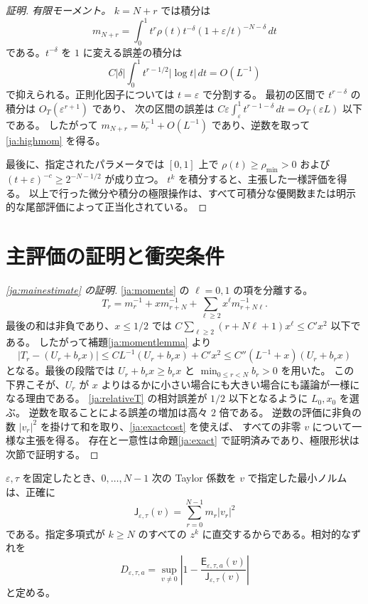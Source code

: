 \documentclass[12pt]{amsart}
\theoremstyle{definition}
\theoremstyle{remark}
\numberwithin{equation}{section}
\newcommand{\Cost}{\mathsf E}
\newcommand{\JetCost}{\mathsf J}
\theoremstyle{definition}
\begin{document}
\begin{proof}[証明]
\emph{有限モーメント。}
$k=N+r$ では積分は
\[
 m_{N+r}=\int_0^1t^r\rho(t)t^{-\delta}
 (1+\varepsilon/t)^{-N-\delta}\,dt
\]
である。$t^{-\delta}$ を $1$ に変える誤差の積分は
\[
 C|\delta|\int_0^1t^{r-1/2}|\log t|\,dt=O(L^{-1})
\]
で抑えられる。正則化因子については $t=\varepsilon$ で分割する。
最初の区間で $t^{r-\delta}$ の積分は $O_T(\varepsilon^{r+1})$ であり、
次の区間の誤差は
$C\varepsilon\int_\varepsilon^1t^{r-1-\delta}\,dt
=O_T(\varepsilon L)$ 以下である。
したがって $m_{N+r}=b_r^{-1}+O(L^{-1})$ であり、逆数を取って \eqref{ja:highmom} を得る。

最後に、指定されたパラメータでは $[0,1]$ 上で
$\rho(t)\ge\rho_{\min}>0$ および $(t+\varepsilon)^{-c}\ge2^{-N-1/2}$ が成り立つ。
$t^k$ を積分すると、主張した一様評価を得る。
以上で行った微分や積分の極限操作は、すべて可積分な優関数または明示的な尾部評価によって正当化されている。
\end{proof}

\section{主評価の証明と衝突条件}
\begin{proof}[\eqref{ja:mainestimate} の証明]
\eqref{ja:moments} の $\ell=0,1$ の項を分離する。
\[
 T_r=m_r^{-1}+xm_{r+N}^{-1}
     +\sum_{\ell\ge2}x^\ell m_{r+N\ell}^{-1}.
\]
最後の和は非負であり、$x\le1/2$ では
$C\sum_{\ell\ge2}(r+N\ell+1)x^\ell\le C'x^2$ 以下である。
したがって補題\ref{ja:momentlemma} より
\begin{equation}\label{ja:relativeT}
 |T_r-(U_r+b_rx)|
 \le C L^{-1}(U_r+b_rx)+C'x^2
 \le C''(L^{-1}+x)(U_r+b_rx)
\end{equation}
となる。最後の段階では $U_r+b_rx\ge b_rx$ と
$\min_{0\le r<N}b_r>0$ を用いた。
この下界こそが、$U_r$ が $x$ よりはるかに小さい場合にも大きい場合にも議論が一様になる理由である。
\eqref{ja:relativeT} の相対誤差が $1/2$ 以下となるように $L_0,x_0$ を選ぶ。
逆数を取ることによる誤差の増加は高々 $2$ 倍である。
逆数の評価に非負の数 $|v_r|^2$ を掛けて和を取り、\eqref{ja:exactcost} を使えば、
すべての非零 $v$ について一様な主張を得る。
存在と一意性は命題\ref{ja:exact} で証明済みであり、極限形状は次節で証明する。
\end{proof}

$\varepsilon,\tau$ を固定したとき、$0,\ldots,N-1$ 次の Taylor 係数を $v$ で指定した最小ノルムは、正確に
\begin{equation}\label{ja:jetcost}
 \JetCost_{\varepsilon,\tau}(v)=\sum_{r=0}^{N-1}m_r|v_r|^2
\end{equation}
である。指定多項式が $k\ge N$ のすべての $z^k$ に直交するからである。相対的なずれを
\begin{equation}\label{ja:defect}
 D_{\varepsilon,\tau,a}
 =\sup_{v\ne0}\left|1-
 \frac{\Cost_{\varepsilon,\tau,a}(v)}{\JetCost_{\varepsilon,\tau}(v)}
 \right|
\end{equation}
と定める。
\end{document}
